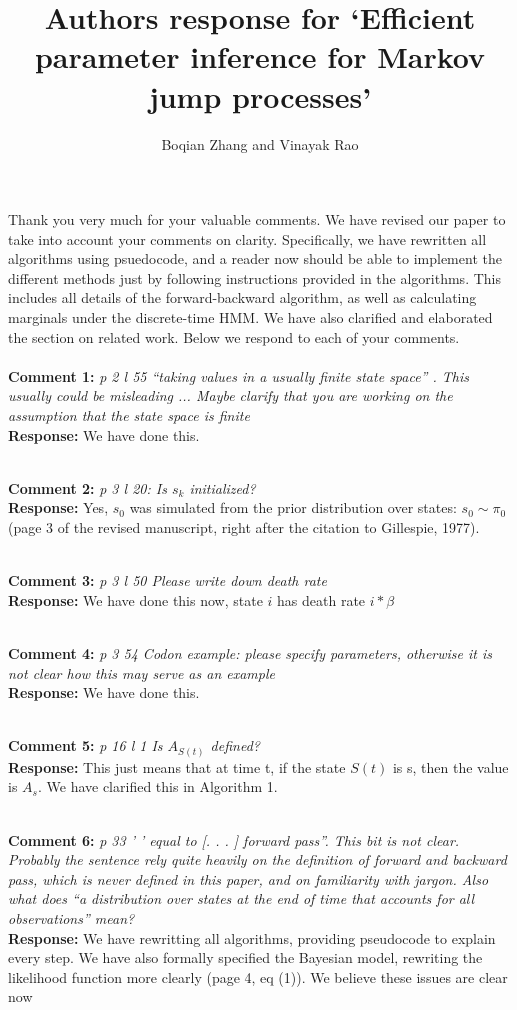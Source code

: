 \documentclass[11pt]{article}
\title{Authors response for `Efficient parameter inference for Markov jump processes'}
\author{Boqian Zhang and Vinayak Rao }
\date{}
\newcommand{\rev}[2]{\textbf{Comment #1: }\emph{#2}}
\newcommand{\resp}{\textbf{Response: }}
\begin{document}
\maketitle

Thank you very much for your valuable comments. We have revised our paper to take into account your comments on clarity. 
Specifically, we have rewritten all algorithms using psuedocode, and a reader now should be able to implement the different methods just by following instructions provided in the algorithms. 
This includes all details of the forward-backward algorithm, as well as calculating marginals under the discrete-time HMM. 
We have also clarified and elaborated the section on related work.
Below we respond to each of your comments.
~\\ 
~\\

\noindent \rev{1}{p 2 l 55 ``taking values in a usually finite state space” . This usually could be misleading ... Maybe clarify that you are working on the assumption that the state space is finite}
\\
\resp We have done this.

~\\
\rev{2}{p 3 l 20: Is $s_k$ initialized?} \\
\resp Yes, $s_0$ was simulated from the prior distribution over states: $s_0 \sim \pi_0$ (page 3 of the revised manuscript, right after the citation to Gillespie, 1977). 

~\\
\rev{3}{p 3 l 50 Please write down death rate} \\ 
\resp  We have done this now, state $i$ has death rate $i*\beta$

~\\
\rev{4}{p 3 54 Codon example: please specify parameters, otherwise it is not clear how this may serve as an example} \\ 
\resp We have done this. 

~\\
\rev{5}{p 16 l 1 Is $A_{S(t)}$ defined?} \\
\resp{This just means that at time t, if the state $S(t)$ is s, then the value is $A_s$. We have clarified this in Algorithm 1.
}

~\\ 
\rev{6}{p 33 ’ ’ equal to [. . . ] forward pass”. This bit is not clear. Probably the sentence rely quite heavily on the definition of forward and backward pass, which is never defined in this paper, and on familiarity with jargon. Also what does “a distribution over states at
the end of time that accounts for all observations” mean?}\\ 
\resp We have rewritting all algorithms, providing pseudocode to explain every step. We have also formally specified the Bayesian model, rewriting the likelihood function more clearly (page 4, eq (1)). We believe these issues are clear now
\end{document}
